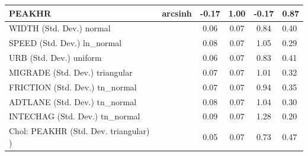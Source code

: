 \begin{table}
\begin{center}
\begin{tabular}{|l|l|c|c|c|l|}
			PEAKHR & arcsinh & -0.17 & 1.00 & -0.17 & 0.87 \\
			\hline
			WIDTH (Std. Dev.) normal &  & 0.06 & 0.07 & 0.84 & 0.40 \\
			\hline
			SPEED (Std. Dev.) ln_normal &  & 0.08 & 0.07 & 1.05 & 0.29 \\
			\hline
			URB (Std. Dev.) uniform &  & 0.06 & 0.07 & 0.83 & 0.41 \\
			\hline
			MIGRADE (Std. Dev.) triangular &  & 0.07 & 0.07 & 1.01 & 0.32 \\
			\hline
			FRICTION (Std. Dev.) tn_normal &  & 0.07 & 0.07 & 0.94 & 0.35 \\
			\hline
			ADTLANE (Std. Dev.) tn_normal &  & 0.08 & 0.07 & 1.04 & 0.30 \\
			\hline
			INTECHAG (Std. Dev.) tn_normal &  & 0.09 & 0.07 & 1.28 & 0.20 \\
			\hline
			 Chol: PEAKHR (Std. Dev. triangular) ) &  & 0.05 & 0.07 & 0.73 & 0.47 \\
			\hline
		\end{tabular}
	\end{center}
\end{table}